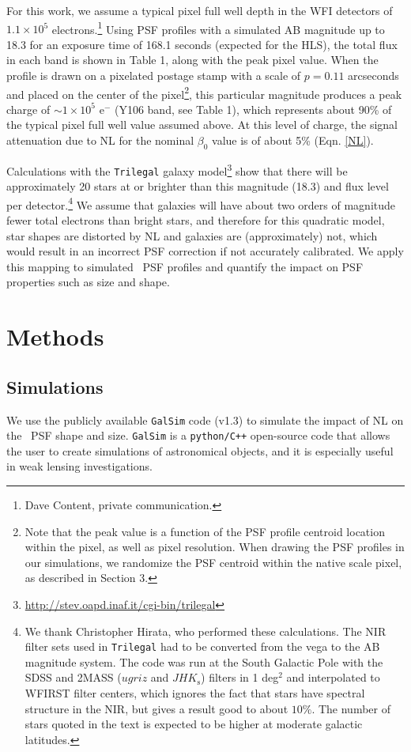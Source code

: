 \documentclass[11pt,preprint,flushrt]{aastex}
\begin{document}
For this work, we assume a typical pixel full well depth in the WFI detectors of $1.1 \times 10^5$ electrons.\footnote{Dave Content, private communication.} Using PSF profiles with a simulated AB magnitude up to 18.3 for an exposure time of 168.1 seconds (expected for the HLS), the total flux in each band is shown in Table 1, along with the peak pixel value. When the profile is drawn on a pixelated postage stamp with a scale of $p=0.11$ arcseconds and placed on the center of the pixel\footnote{Note that the peak value is a function of the PSF profile centroid location within the pixel, as well as pixel resolution. When drawing the PSF profiles in our simulations, we randomize the PSF centroid within the native scale pixel, as described in Section 3.}, this particular magnitude produces a peak charge of $\sim 1\times 10^5$ e$^{-}$ (Y106 band, see Table 1), which represents about 90\% of the typical pixel full well value assumed above. At this level of charge, the signal attenuation due to NL for the nominal $\beta_0$ value is of about 5\% (Eqn. \ref{NL}). 

Calculations with the {\tt{Trilegal}} galaxy model\footnote{\url{http://stev.oapd.inaf.it/cgi-bin/trilegal}} \citep{girardi12} show that there will be approximately 20 stars at or brighter than this magnitude (18.3) and flux level per detector.\footnote{We thank Christopher Hirata, who performed these calculations. The NIR filter sets used in {\tt{Trilegal}} had to be converted from the vega to the AB magnitude system. The code was run at the South Galactic Pole with the SDSS and 2MASS ($ugriz$ and $JHK_\mathrm{s}$) filters in 1 deg$^2$ and interpolated to WFIRST filter centers, which ignores the fact that stars have spectral structure in the NIR, but gives a result good to about $10\%$. The number of stars quoted in the text is expected to be higher at moderate galactic latitudes.} We assume that galaxies will have about two orders of magnitude fewer total electrons than bright stars, and therefore for this quadratic model, star shapes are distorted by NL and galaxies are (approximately) not, which would result in an incorrect PSF correction if not accurately calibrated. We apply this mapping to simulated \wfa\ PSF profiles and quantify the impact on PSF properties such as size and shape. 

\section{Methods}
\label{methods}
\subsection {Simulations}
We use the publicly available {\tt{GalSim}} code (v1.3) to simulate the impact of NL on the \wfa\ PSF shape and size. {\tt{GalSim}} is a {\tt{python/C++}} open-source code that allows the user to create simulations of astronomical objects, and it is especially useful in weak lensing investigations. 
\end{document}
